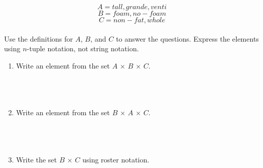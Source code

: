 \documentclass{amsart}
\theoremstyle{definition}
\theoremstyle{Exercise}
\theoremstyle{remark}
\theoremstyle{rule}
\numberwithin{equation}{section}
\begin{document}
\[A = {tall, grande, venti}\]
\[B = {foam, no-foam}\]
\[C = {non-fat, whole}\]\\
Use the definitions for $A$, $B$, and $C$ to answer the questions. Express the elements using $n$-tuple notation, not string notation.\\
\begin{enumerate}[label=(\alph*)]
  \item Write an element from the set $A\, \times \,B \, \times \,C$.\\\\
\\\\
  \item Write an element from the set $B\, \times \,A \, \times \,C$.\\\\
\\\\
  \item Write the set $B \, \times \,C$ using roster notation.\\\\
\\\\
\end{enumerate}
\end{document}
